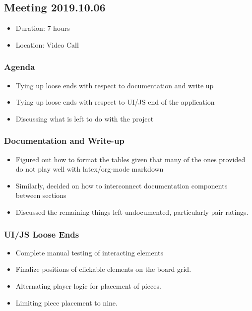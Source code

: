 \documentclass[11pt]{article}
\begin{document}
\subsection{Meeting 2019.10.06}
\label{sec:org278fcd4}
\begin{itemize}
\item Duration: 7 hours
\item Location: Video Call
\end{itemize}
\subsubsection*{Agenda}
\label{sec:org1188fea}
\begin{itemize}
\item Tying up loose ends with respect to documentation and write up
\item Tying up loose ends with respect to UI/JS end of the application
\item Discussing what is left to do with the project
\end{itemize}
\subsubsection*{Documentation and Write-up}
\label{sec:orgf5e93e3}
\begin{itemize}
\item Figured out how to format the tables given that many of the ones provided do not play well
with latex/org-mode markdown
\item Similarly, decided on how to interconnect documentation components between sections
\item Discussed the remaining things left undocumented, particularly pair ratings.
\end{itemize}
\subsubsection*{UI/JS Loose Ends}
\label{sec:org594780d}
\begin{itemize}
\item Complete manual testing of interacting elements
\item Finalize positions of clickable elements on the board grid.
\item Alternating player logic for placement of pieces.
\item Limiting piece placement to nine.
\end{itemize}
\end{document}
